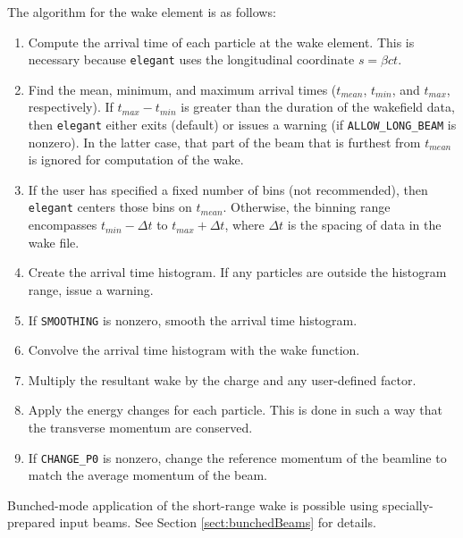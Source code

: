 The algorithm for the wake element is as follows:
\begin{enumerate}
\item Compute the arrival time of each particle at the wake element. This
 is necessary because {\tt elegant} uses the longitudinal coordinate $s=\beta c t$.
\item Find the mean, minimum, and maximum arrival times ($t_{mean}$, $t_{min}$, and
 $t_{max}$, respectively).  If $t_{max}-t_{min}$ is greater than the duration of 
 the wakefield data, then {\tt elegant} either exits (default) or issues a warning (if 
 \verb|ALLOW_LONG_BEAM| is nonzero).  In the latter case, that part of the beam that
 is furthest from $t_{mean}$ is ignored for computation of the wake.
\item If the user has specified a fixed number of bins (not recommended), then {\tt elegant}
 centers those bins on $t_{mean}$.  Otherwise, the binning range encompasses $t_{min}-\Delta t$
 to $t_{max}+\Delta t$, where $\Delta t$ is the spacing of data in the wake file.
\item Create the arrival time histogram.  If any particles are outside the histogram range,
 issue a warning.
\item If \verb|SMOOTHING| is nonzero, smooth the arrival time histogram.
\item Convolve the arrival time histogram with the wake function.
\item Multiply the resultant wake by the charge and any user-defined factor.
\item Apply the energy changes for each particle.  This is done in such a way that
 the transverse momentum are conserved.
\item If \verb|CHANGE_P0| is nonzero, change the reference momentum of the beamline to 
 match the average momentum of the beam.
\end{enumerate}

Bunched-mode application of the short-range wake is possible using specially-prepared input
beams. 
See Section \ref{sect:bunchedBeams} for details.
